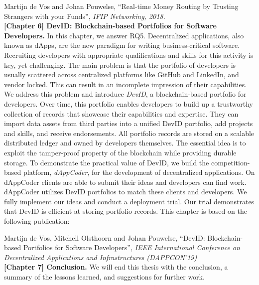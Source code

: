 Martijn de Vos and Johan Pouwelse, \enquote{Real-time Money Routing by Trusting Strangers with your Funds}, \emph{IFIP Networking, 2018.}\\

\textbf{[Chapter 6] DevID: Blockchain-based Portfolios for Software Developers.}
In this chapter, we answer RQ5.
Decentralized applications, also known as dApps, are the new paradigm for writing business-critical software.
Recruiting developers with appropriate qualifications and skills for this activity is key, yet challenging.
The main problem is that the portfolio of developers is usually scattered across centralized platforms like GitHub and LinkedIn, and vendor locked.
This can result in an incomplete impression of their capabilities.
We address this problem and introduce \emph{DevID}, a blockchain-based portfolio for developers.
Over time, this portfolio enables developers to build up a trustworthy collection of records that showcase their capabilities and expertise.
They can import data assets from third parties into a unified DevID portfolio, add projects and skills, and receive endorsements.
All portfolio records are stored on a scalable distributed ledger and owned by developers themselves.
The essential idea is to exploit the tamper-proof property of the blockchain while providing durable storage.
To demonstrate the practical value of DevID, we build the competition-based platform, \emph{dAppCoder}, for the development of decentralized applications.
On dAppCoder clients are able to submit their ideas and developers can find work.
dAppCoder utilizes DevID portfolios to match these clients and developers.
We fully implement our ideas and conduct a deployment trial.
Our trial demonstrates that DevID is efficient at storing portfolio records.
This chapter is based on the following publication:

Martijn de Vos, Mitchell Olsthoorn and Johan Pouwelse, \enquote{DevID: Blockchain-based Portfolios for Software Developers}, \emph{IEEE International Conference on Decentralized Applications and Infrastructures (DAPPCON'19)}\\

\textbf{[Chapter 7] Conclusion.} We will end this thesis with the conclusion, a summary of the lessons learned, and suggestions for further work.



